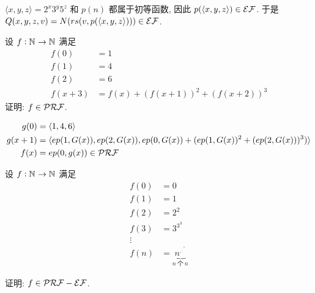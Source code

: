 \begin{solution}
$\langle x, y, z \rangle = 2^x 3^y 5^z$ 和 $p(n)$ 都属于初等函数, 因此 $p(\langle x, y, z \rangle) \in \mathcal{EF}$. 于是 $Q(x, y, z, v) = N(rs(v, p(\langle x, y, z \rangle))) \in \mathcal{EF}$.
\end{solution}

\begin{problem}
设 $f : \mathbb{N}^{} \to \mathbb{N}^{}$ 满足
\begin{align*}
f(0) & = 1 \\
f(1) & = 4 \\
f(2) & = 6 \\
f(x + 3) & = f(x) + (f(x + 1))^2 + (f(x+2))^3
\end{align*}
证明: $f \in \mathcal{PRF}$.
\end{problem}

\begin{solution}
\begin{align*}
g(0) & = \langle 1, 4, 6 \rangle \\
g(x + 1) & = \langle ep(1, G(x)), ep(2, G(x)), ep(0, G(x)) + (ep(1, G(x))^2 + (ep(2, G(x)))^3 ) \rangle \\
f(x) & = ep(0, g(x)) \in \mathcal{PRF}
\end{align*}
\end{solution}

\begin{problem}
设 $f : \mathbb{N}^{} \to \mathbb{N}^{}$ 满足
\begin{align*}
f(0) & = 0 \\
f(1) & = 1 \\
f(2) & = 2^2 \\
f(3) & = 3^{3^3} \\
\vdots \\
f(n) & = \underbrace{n^{{.}^{{.}^{{.}^{n}}}}}_{n ~ \text{个} ~ n}
\end{align*}

证明: $f \in \mathcal{PRF} - \mathcal{EF}$.
\end{problem}

